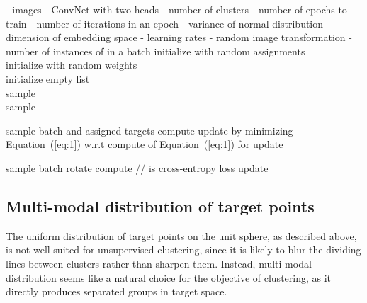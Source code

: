 \documentclass[a4paper,conference]{IEEEtran}
\begin{document}
\begin{algorithm}[bt]
\caption{}
\label{algo:1}
\begin{algorithmic}
    \newline
        - images \newline
        - ConvNet with two heads \newline
        - number of clusters \newline
        - number of epochs to train \newline
        - number of iterations in an epoch \newline
        - variance of normal distribution \newline
        - dimension of embedding space \newline
        - learning rates \newline
        - random image transformation \newline
        - number of instances of  in a batch
    \newline
         initialize with random assignments \\
        initialize with random weights \\
        initialize empty list \\
    \FOR {}
    \STATE sample  \\
    \STATE sample \\
    \STATE 
    \ENDFOR
   
   \FOR {}
    \FOR {}
       \STATE sample batch  and assigned targets 
       \STATE compute 
       \STATE update  by minimizing Equation~(\ref{eq:1}) w.r.t 
       \STATE compute  of Equation~(\ref{eq:1}) for 
       \STATE update 
     \ENDFOR
     
    \FOR {}
       \STATE sample batch 
       \STATE rotate   
       \STATE compute   //  is cross-entropy loss
       \STATE update 
       
     \ENDFOR
     \ENDFOR
\end{algorithmic}
\end{algorithm}

\subsection{Multi-modal distribution of target points}

The uniform distribution of target points on the unit sphere, as described above, is not well suited for unsupervised clustering, since it is likely to blur the dividing lines between clusters rather than sharpen them. Instead,  multi-modal distribution seems like a natural choice for the objective of clustering, as it directly produces separated groups in target space. 
\end{document}
